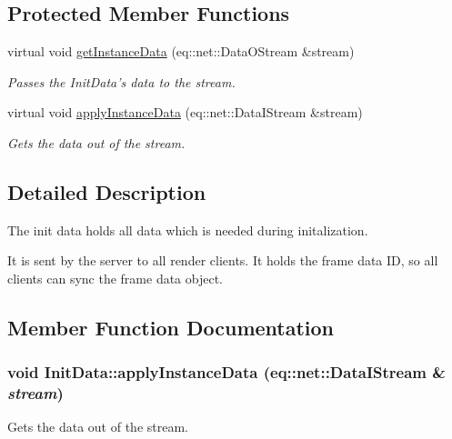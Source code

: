 \subsection*{Protected Member Functions}
\begin{CompactItemize}
\item 
virtual void \hyperlink{a00011_3604e3e7cc5b5c19f62bcf44d75d459f}{getInstanceData} (eq::net::DataOStream \&stream)
\begin{CompactList}\small\item\em Passes the InitData's data to the stream. \item\end{CompactList}\item 
virtual void \hyperlink{a00011_c9fa7b403a16477dc402a2e31b04ca50}{applyInstanceData} (eq::net::DataIStream \&stream)
\begin{CompactList}\small\item\em Gets the data out of the stream. \item\end{CompactList}\end{CompactItemize}


\subsection{Detailed Description}
The init data holds all data which is needed during initalization. 

It is sent by the server to all render clients. It holds the frame data ID, so all clients can sync the frame data object. 

\subsection{Member Function Documentation}
\hypertarget{a00011_c9fa7b403a16477dc402a2e31b04ca50}{
\subsubsection[{applyInstanceData}]{\setlength{\rightskip}{0pt plus 5cm}void InitData::applyInstanceData (eq::net::DataIStream \& {\em stream})}}
\label{a00011_c9fa7b403a16477dc402a2e31b04ca50}


Gets the data out of the stream. 

